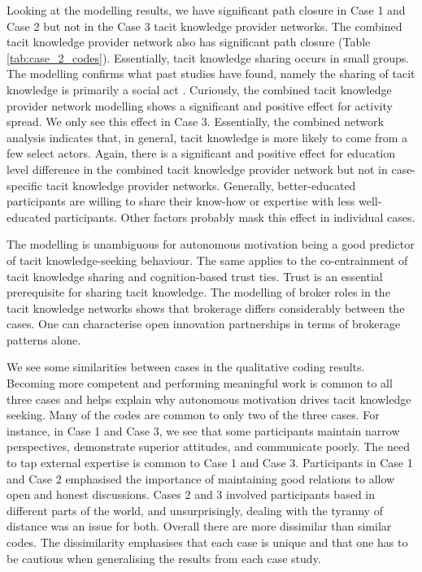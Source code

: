Looking at the modelling results, we have significant path closure in Case 1 and Case 2 but not in the Case 3 tacit knowledge provider networks. The combined tacit knowledge provider network also has significant path closure (Table \ref{tab:case_2_codes}). Essentially, tacit knowledge sharing occurs in small groups. The modelling confirms what past studies have found, namely the sharing of tacit knowledge is primarily a social act \citep{nonaka1994dynamic,kaser2001knowledge,zhang2016critical}. Curiously, the combined tacit knowledge provider network modelling shows a significant and positive effect for activity spread. We only see this effect in Case 3. Essentially, the combined network analysis indicates that, in general, tacit knowledge is more likely to come from a few select actors. Again, there is a significant and positive effect for education level difference in the combined tacit knowledge provider network but not in case-specific tacit knowledge provider networks. Generally, better-educated participants are willing to share their know-how or expertise with less well-educated participants. Other factors probably mask this effect in individual cases. \medskip

The modelling is unambiguous for autonomous motivation being a good predictor of tacit knowledge-seeking behaviour. The same applies to the co-entrainment of tacit knowledge sharing and cognition-based trust ties. Trust is an essential prerequisite for sharing tacit knowledge. The modelling of broker roles in the tacit knowledge networks shows that brokerage differs considerably between the cases. One can characterise open innovation partnerships in terms of brokerage patterns alone. \medskip

We see some similarities between cases in the qualitative coding results. Becoming more competent and performing meaningful work is common to all three cases and helps explain why autonomous motivation drives tacit knowledge seeking. Many of the codes are common to only two of the three cases. For instance, in Case 1 and Case 3, we see that some participants maintain narrow perspectives, demonstrate superior attitudes, and communicate poorly. The need to tap external expertise is common to Case 1 and Case 3. Participants in Case 1 and Case 2 emphasised the importance of maintaining good relations to allow open and honest discussions. Cases 2 and 3 involved participants based in different parts of the world, and unsurprisingly, dealing with the tyranny of distance was an issue for both. Overall there are more dissimilar than similar codes. The dissimilarity emphasises that each case is unique and that one has to be cautious when generalising the results from each case study.

